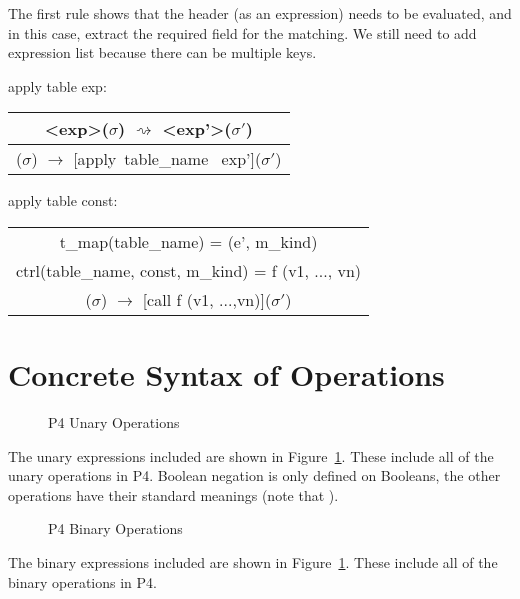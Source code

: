 \documentclass[UTF8]{article}
\makeatletter
\newcommand*{\inference}[3][t]{%
   \begingroup
   \def\and{\\}%
   \begin{tabular}[#1]{@{\enspace}c@{\enspace}}
   #2 \\
   \hline
   #3
   \end{tabular}%
   \endgroup
}
\makeatother
\begin{document}
The first rule shows that the header (as an expression) needs to be evaluated, and in this case, extract the required field for the matching. 
We still need to add expression list because there can be multiple keys.

\bigskip
apply table exp:
\bigskip
\inference[c]{<exp>($\sigma$) $\rightsquigarrow$ <exp'>($\sigma '$) }
            {[apply table\_name exp]($\sigma$) $\rightarrow$ [apply\ table\_name \ exp']($\sigma'$)} \bigskip

\bigskip
apply table const:
\bigskip
\inference[c]{t\_map(table\_name) = (e', m\_kind)
            \and ctrl(table\_name, const, m\_kind) = f (v1, ..., vn) } 
            {[apply table\_name const]($\sigma$) $\rightarrow$ [call f (v1, ...,vn)]($\sigma '$)}
\bigskip
              

\printbibliography

\clearpage
\appendix
\section{Concrete Syntax of Operations}
\label{app:op}
\begin{figure}[ht!]
\centering\ottgrammartabular{
\ottunop\ottafterlastrule
}
\caption{P4 Unary Operations}
\label{fig:unop}
\end{figure}

The unary expressions included are shown in Figure~\ref{fig:unop}. These include all of the unary operations in P4. Boolean negation is only defined on Booleans, the other operations have their standard meanings (note that ).

\newpage
\begin{figure}[ht!]
\centering\ottgrammartabular{
\ottbinop\ottafterlastrule
}
\caption{P4 Binary Operations}
\label{fig:binop}
\end{figure}

The binary expressions included are shown in Figure~\ref{fig:unop}. These include all of the binary operations in P4.
\end{document}
